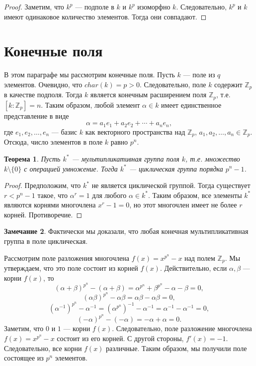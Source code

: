 \documentclass[12pt, titlepage, oneside]{amsbook}
\newcommand{\ZZ}{\mathbb{Z}}
\newtheorem{theorem}{Теорема}[chapter]
\theoremstyle{definition}
\newtheorem{remark}[theorem]{Замечание}
\theoremstyle{remark}
\begin{document}
\begin{proof}
	Заметим, что $k^p$ --- подполе в $k$ и $k^p$ изоморфно $k$. Следовательно, $k^p$ и $k$ имеют одинаковое количество элементов. Тогда они совпадают.
\end{proof}

\section{Конечные поля}

В этом параграфе мы рассмотрим конечные поля. Пусть $k$ --- поле из $q$ элементов. Очевидно, что $char(k)=p>0$. Следовательно, поле $k$ содержит $\ZZ_p$ в качестве подполя. Тогда $k$ является конечным расширением поля $\ZZ_p$, т.е. $[k:\ZZ_p]=n$. Таким образом, любой элемент $\alpha\in k$ имеет единственное представление в виде $$\alpha=a_1e_1+a_2e_2+\cdots+a_ne_n,$$ где $e_1,e_2,\ldots,e_n$ --- базис $k$ как векторного пространства над $\ZZ_p$, $a_1,a_2,\ldots,a_n\in\ZZ_p$. Отсюда, число элементов в поле $k$ равно $p^n$.

\begin{theorem}
	\label{Kon1}
	Пусть $k^*$ --- мультипликативная группа поля $k$, т.е. множество $k\setminus\{0\}$ с операцией умножение. Тогда $k^*$ --- циклическая группа порядка $p^n-1$.
\end{theorem}

\begin{proof}
	Предположим, что $k^*$ не является циклической группой. Тогда существует $r<p^n-1$ такое, что $\alpha^r=1$ для любого $\alpha\in k^*$. Таким образом, все элементы $k^*$ являются корнями многочлена $x^r-1=0$, но этот многочлен имеет не более $r$ корней. Противоречие.
\end{proof}

\begin{remark}
	Фактически мы доказали, что любая конечная мультипликативная группа в поле циклическая.
\end{remark}

Рассмотрим поле разложения многочлена $f(x)=x^{p^n}-x$ над полем $\ZZ_p$. Мы утверждаем, что это поле состоит из корней $f(x)$. Действительно, если $\alpha,\beta$ --- корни $f(x)$, то $$(\alpha+\beta)^{p^n}-(\alpha+\beta)=\alpha^{p^n}+\beta^{p^n}-\alpha-\beta=0,$$ $$(\alpha\beta)^{p^n}-\alpha\beta=\alpha\beta-\alpha\beta=0,$$ $$(\alpha^{-1})^{p^n}-\alpha^{-1}=(\alpha^{p^n})^{-1}-\alpha^{-1}=\alpha^{-1}-\alpha^{-1}=0,$$ $$(-\alpha)^{p^n}-(-\alpha)=-\alpha+\alpha=0.$$ Заметим, что $0$ и $1$ --- корни $f(x)$. Следовательно, поле разложение многочлена $f(x)=x^{p^n}-x$ состоит из его корней. С другой стороны, $f'(x)=-1$. Следовательно, все корни $f(x)$ различные. Таким образом, мы получили поле состоящее из $p^n$ элементов.
\end{document}
